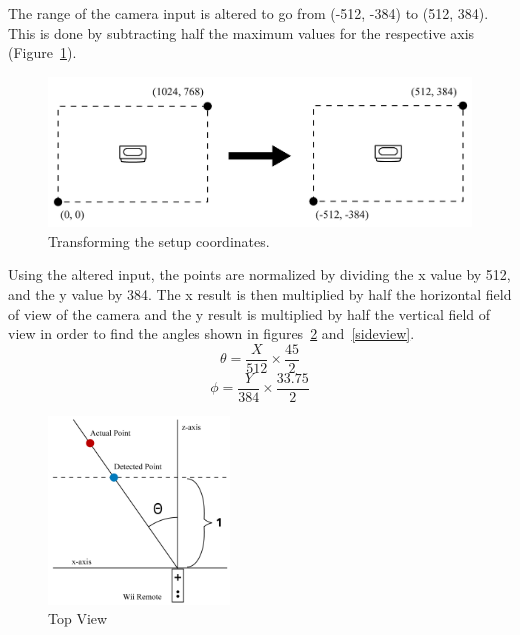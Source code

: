 \documentclass[a4paper,twoside]{article}
\begin{document}
\begin{indenteddescription}
\item[Step 1:]The range of the camera input is altered to go from (-512, -384) to (512, 384). This is done by subtracting half the maximum values for the respective axis (Figure~\ref{coordinates}). 

\begin{figure}[h]
\begin{center}
\includegraphics[width = 7.5 cm]{Diagram3_CoordinateShift.png}
\end{center}
\caption{Transforming the setup coordinates.}
\label{coordinates}
\end{figure}

\item[Step 2:] Using the altered input, the points are normalized by dividing the x value by 512, and the y value by 384. The x result is then multiplied by half the horizontal field of view of the camera and the y result is multiplied by half the vertical field of view in order to find the angles shown in 
figures~\ref{topview} and~\ref{sideview}.
\begin{equation} \theta = \frac{X}{512} \times \frac{45}{2} \end{equation}
\begin{equation} \phi = \frac{Y}{384} \times \frac{33.75}{2} \end{equation}


\begin{figure}[t]
\begin{center}
\includegraphics[height = 5cm]{Diagram1_CalcTopView.png}
\end{center}
\caption{Top View}
\label{topview}
\end{figure}


\end{indenteddescription}
\end{document}
